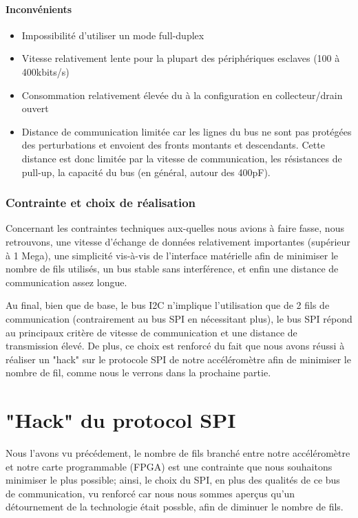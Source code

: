 \documentclass[french,a4paper,12pt]{report}
\begin{document}
  		\subsubsection{Inconvénients}
			\begin{itemize}
			\item Impossibilité d’utiliser un mode full-duplex 
			\item Vitesse relativement lente pour la plupart des périphériques esclaves (100 à 400kbits/s) 
			\item Consommation relativement élevée du à la configuration en collecteur/drain ouvert 
			\item Distance de communication limitée car les lignes du bus ne sont pas protégées des perturbations et envoient des fronts montants et descendants. Cette distance est donc limitée par la vitesse de communication, les résistances de pull-up, la capacité du bus (en général, autour des 400pF).
\end{itemize}
 
 \subsection{Contrainte et choix de réalisation}
Concernant les contraintes techniques aux-quelles nous avions à faire fasse, nous retrouvons, une vitesse d'échange de données relativement importantes (supérieur à 1 Mega), une simplicité vis-à-vis de l'interface matérielle afin de minimiser le nombre de fils utilisés, un bus stable sans interférence, et enfin une distance de communication assez longue.

Au final, bien que de base, le bus I2C n'implique l'utilisation que de 2 fils de communication (contrairement au bus SPI en nécessitant plus), le bus SPI répond au principaux critère de vitesse de communication et une distance de transmission élevé. De plus, ce choix est renforcé du fait que nous avons réussi à réaliser un "hack" sur le protocole SPI de notre accéléromètre afin de minimiser le nombre de fil, comme nous le verrons dans la prochaine partie.


\chapter{"Hack" du protocol SPI}
	Nous l'avons vu précédement, le nombre de fils branché entre notre accéléromètre et notre carte programmable (FPGA) est une contrainte que nous souhaitons minimiser le plus possible; ainsi, le choix du SPI, en plus des qualités de ce bus de communication, vu renforcé car nous nous sommes aperçus qu'un détournement de la technologie était possble, afin de diminuer le nombre de fils.
	
\end{document}
